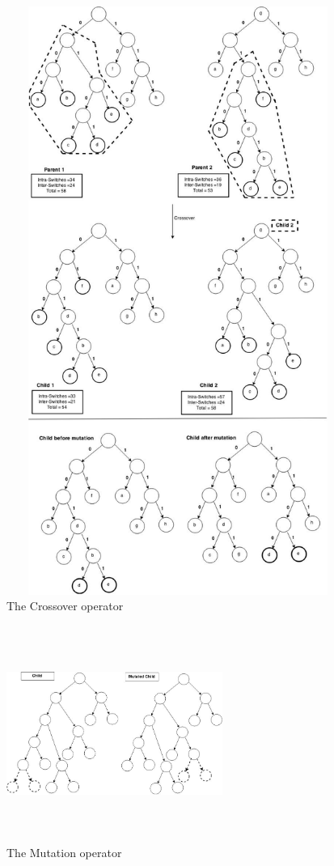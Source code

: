 \documentclass[preprint,12pt]{elsarticle}
\begin{document}
\begin{figure}[t]
\begin{center}
\includegraphics[width=400pt,height=545pt]{Images/Drawing1-1.jpg}
\caption{The Crossover operator}
\end{center}
\label{Fig1}
\end{figure}
\begin{figure}[h]
\begin{center}
\includegraphics[width=200pt,height=200pt]{Images/Drawing2.jpg}
\caption{The Mutation operator}
\end{center}
\label{Fig1}
\end{figure}
\end{document}
